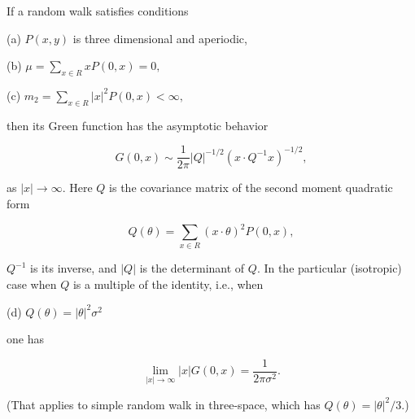 If a random walk satisfies conditions

(a) $P(x,y)$ is three dimensional and aperiodic,

(b) $\mu = \sum_{x \in R} xP(0,x) = 0,$

(c) $m_2 = \sum_{x \in R} |x|^2P(0,x) < \infty,$

then its Green function has the asymptotic behavior

$$G(0,x) \sim \frac{1}{2\pi} |Q|^{-1/2}(x \cdot Q^{-1}x)^{-1/2},$$

as $|x| \to \infty$. Here $Q$ is the covariance matrix of the second moment quadratic form

$$Q(\theta) = \sum_{x \in R} (x \cdot \theta)^2P(0,x),$$

$Q^{-1}$ is its inverse, and $|Q|$ is the determinant of $Q$. In the particular (isotropic) case when $Q$ is a multiple of the identity, i.e., when

(d) $Q(\theta) = |\theta|^2\sigma^2$

one has

$$\lim_{|x| \to \infty} |x|G(0,x) = \frac{1}{2\pi\sigma^2}.$$

(That applies to simple random walk in three-space, which has $Q(\theta) = |\theta|^2/3.$)